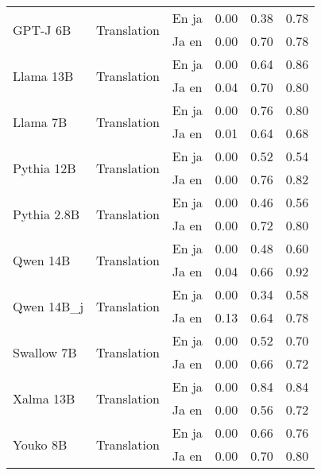 \begin{center}
\begin{longtable}{lllrrr}
\multirow[t]{2}{*}{GPT-J 6B} & \multirow[t]{2}{*}{Translation} & En ja & 0.00 & 0.38 & 0.78 \\
 &  & Ja en & 0.00 & 0.70 & 0.78 \\
\cline{1-6} \cline{2-6}
\multirow[t]{2}{*}{Llama 13B} & \multirow[t]{2}{*}{Translation} & En ja & 0.00 & 0.64 & 0.86 \\
 &  & Ja en & 0.04 & 0.70 & 0.80 \\
\cline{1-6} \cline{2-6}
\multirow[t]{2}{*}{Llama 7B} & \multirow[t]{2}{*}{Translation} & En ja & 0.00 & 0.76 & 0.80 \\
 &  & Ja en & 0.01 & 0.64 & 0.68 \\
\cline{1-6} \cline{2-6}
\multirow[t]{2}{*}{Pythia 12B} & \multirow[t]{2}{*}{Translation} & En ja & 0.00 & 0.52 & 0.54 \\
 &  & Ja en & 0.00 & 0.76 & 0.82 \\
\cline{1-6} \cline{2-6}
\multirow[t]{2}{*}{Pythia 2.8B} & \multirow[t]{2}{*}{Translation} & En ja & 0.00 & 0.46 & 0.56 \\
 &  & Ja en & 0.00 & 0.72 & 0.80 \\
\cline{1-6} \cline{2-6}
\multirow[t]{2}{*}{Qwen 14B} & \multirow[t]{2}{*}{Translation} & En ja & 0.00 & 0.48 & 0.60 \\
 &  & Ja en & 0.04 & 0.66 & 0.92 \\
\cline{1-6} \cline{2-6}
\multirow[t]{2}{*}{Qwen 14B_j} & \multirow[t]{2}{*}{Translation} & En ja & 0.00 & 0.34 & 0.58 \\
 &  & Ja en & 0.13 & 0.64 & 0.78 \\
\cline{1-6} \cline{2-6}
\multirow[t]{2}{*}{Swallow 7B} & \multirow[t]{2}{*}{Translation} & En ja & 0.00 & 0.52 & 0.70 \\
 &  & Ja en & 0.00 & 0.66 & 0.72 \\
\cline{1-6} \cline{2-6}
\multirow[t]{2}{*}{Xalma 13B} & \multirow[t]{2}{*}{Translation} & En ja & 0.00 & 0.84 & 0.84 \\
 &  & Ja en & 0.00 & 0.56 & 0.72 \\
\cline{1-6} \cline{2-6}
\multirow[t]{2}{*}{Youko 8B} & \multirow[t]{2}{*}{Translation} & En ja & 0.00 & 0.66 & 0.76 \\
 &  & Ja en & 0.00 & 0.70 & 0.80 \\
\cline{1-6} \cline{2-6}
\bottomrule
\end{longtable}

\end{center}
\twocolumn